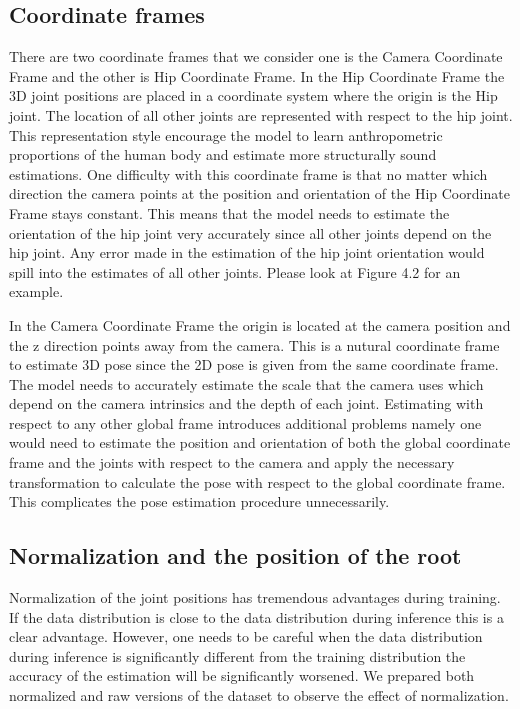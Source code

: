 \subsection{Coordinate frames}

There are two coordinate frames that we consider one is the Camera Coordinate Frame and the other is Hip Coordinate Frame. In the Hip Coordinate Frame the 3D joint positions are placed in a coordinate system where the origin is the Hip joint. The location of all other joints are represented with respect to the hip joint. This representation style encourage the model to learn anthropometric proportions of the human body and estimate more structurally sound estimations. One difficulty with this coordinate frame is that no matter which direction the camera points at the position and orientation of the Hip Coordinate Frame stays constant. This means that the model needs to estimate the orientation of the hip joint very accurately since all other joints depend on the hip joint. Any error made in the estimation of the hip joint orientation would spill into the estimates of all other joints. Please look at Figure 4.2 for an example.

In the Camera Coordinate Frame the origin is located at the camera position and the z direction points away from the camera. This is a nutural coordinate frame to estimate 3D pose since the 2D pose is given from the same coordinate frame. The model needs to accurately estimate the scale that the camera uses which depend on the camera intrinsics and the depth of each joint. Estimating with respect to any other global frame introduces additional problems namely one would need to estimate the position and orientation of both the global coordinate frame and the joints with respect to the camera and apply the necessary transformation to calculate the pose with respect to the global coordinate frame. This complicates the pose estimation procedure unnecessarily.

\subsection{Normalization and the position of the root}

Normalization of the joint positions has tremendous advantages during training. If the data distribution is close to the data distribution during inference this is a clear advantage. However, one needs to be careful when the data distribution during inference is significantly different from the training distribution the accuracy of the estimation will be significantly worsened. We prepared both normalized and raw versions of the dataset to observe the effect of normalization.

